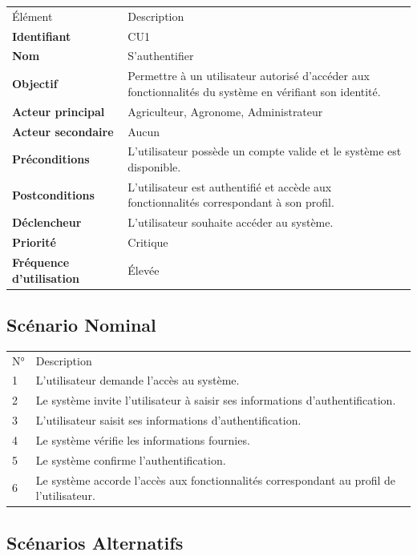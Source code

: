 \documentclass[
]{book}
\begin{document}
\begin{longtable}[]{@{}ll@{}}
\toprule
\endhead
Élément & Description \\
\textbf{Identifiant} & CU1 \\
\textbf{Nom} & S'authentifier \\
\textbf{Objectif} & Permettre à un utilisateur autorisé d'accéder aux
fonctionnalités du système en vérifiant son identité. \\
\textbf{Acteur principal} & Agriculteur, Agronome, Administrateur \\
\textbf{Acteur secondaire} & Aucun \\
\textbf{Préconditions} & L'utilisateur possède un compte valide et le
système est disponible. \\
\textbf{Postconditions} & L'utilisateur est authentifié et accède aux
fonctionnalités correspondant à son profil. \\
\textbf{Déclencheur} & L'utilisateur souhaite accéder au système. \\
\textbf{Priorité} & Critique \\
\textbf{Fréquence d'utilisation} & Élevée \\
\bottomrule
\end{longtable}

\hypertarget{scuxe9nario-nominal}{%
\subsection{Scénario Nominal}\label{scuxe9nario-nominal}}

\begin{longtable}[]{@{}ll@{}}
\toprule
\endhead
N° & Description \\
1 & L'utilisateur demande l'accès au système. \\
2 & Le système invite l'utilisateur à saisir ses informations
d'authentification. \\
3 & L'utilisateur saisit ses informations d'authentification. \\
4 & Le système vérifie les informations fournies. \\
5 & Le système confirme l'authentification. \\
6 & Le système accorde l'accès aux fonctionnalités correspondant au
profil de l'utilisateur. \\
\bottomrule
\end{longtable}

\hypertarget{scuxe9narios-alternatifs}{%
\subsection{Scénarios Alternatifs}\label{scuxe9narios-alternatifs}}
\end{document}
